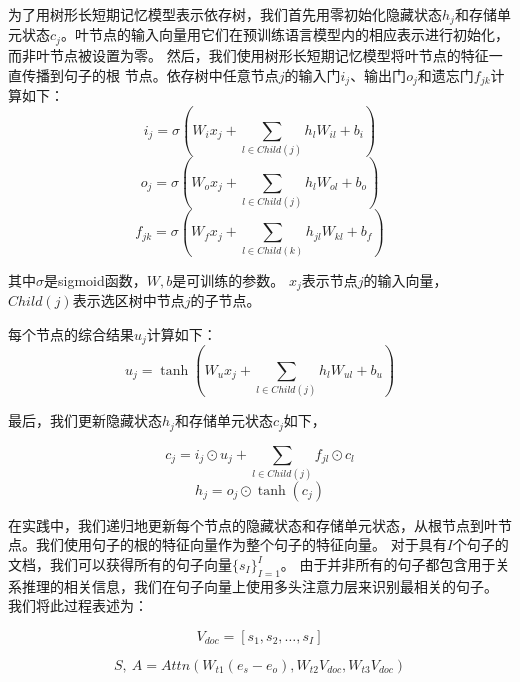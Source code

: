 \documentclass[bachelor]{thesis-uestc}
\begin{document}
为了用树形长短期记忆模型表示依存树，我们首先用零初始化隐藏状态$h_j$和存储单元状态$c_j$。叶节点的输入向量用它们在预训练语言模型内的相应表示进行初始化，而非叶节点被设置为零。
然后，我们使用树形长短期记忆模型\cite{miwa-bansal-2016-end}将叶节点的特征一直传播到句子的根
节点。依存树中任意节点$j$的输入门$i_j$、输出门$o_j$和遗忘门$f_{jk}$计算如下：
\begin{equation}
    i_j = \sigma(W_ix_j +\sum_{l \in Child(j)}h_{l}W_{il}+b_i) 
\end{equation}
\begin{equation}
    o_j = \sigma(W_ox_j +\sum_{l \in Child(j)}h_{l}W_{ol}+b_o) 
\end{equation}
\begin{equation}
    f_{jk} = \sigma(W_fx_j +\sum_{l \in Child(k)}h_{jl}W_{kl}+b_f)
\end{equation}

其中$\sigma$是sigmoid函数，$W, b$是可训练的参数。
$x_j$表示节点$j$的输入向量，$Child(j)$表示选区树中节点$j$的子节点。\par
每个节点的综合结果$u_j$计算如下：
\begin{equation}
    u_j = \tanh(W_ux_j +\sum_{l \in Child(j)}h_{l}W_{ul}+b_u)
\end{equation}
\par

最后，我们更新隐藏状态$h_j$和存储单元状态$c_j$如下，

\begin{equation}
    c_j = i_j \odot u_j + \sum_{l \in Child(j)} f_{jl} \odot c_l
\end{equation}
\begin{equation}
    h_j = o_j \odot \tanh(c_j)
\end{equation}
\par

在实践中，我们递归地更新每个节点的隐藏状态和存储单元状态，从根节点到叶节点。我们使用句子的根的特征向量作为整个句子的特征向量。
对于具有$I$个句子的文档，我们可以获得所有的句子向量$\{s_I\}_{I=1}^{I}$。
由于并非所有的句子都包含用于关系推理的相关信息，我们在句子向量上使用多头注意力层来识别最相关的句子。
我们将此过程表述为：

\begin{equation}
    V_{doc} = [s_1, s_2, \dots, s_I]
\end{equation}

\begin{equation}
    S,\  A = Attn(W_{t1}(e_s-e_o), W_{t2} V_{doc}, W_{t3} V_{doc})
\end{equation}\label{Attn}
\end{document}
